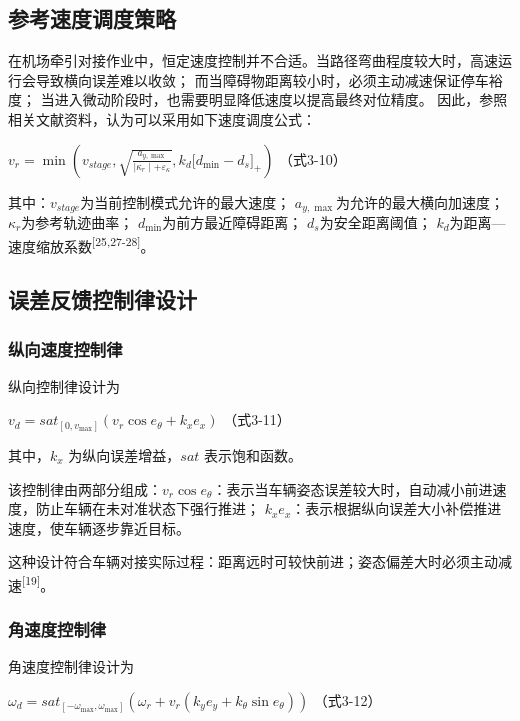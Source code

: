 \documentclass[UTF8,a4paper,12pt]{ctexart}
\begin{document}
\subsection{参考速度调度策略}\label{_Toc228997205}

在机场牵引对接作业中，恒定速度控制并不合适。当路径弯曲程度较大时，高速运行会导致横向误差难以收敛； 而当障碍物距离较小时，必须主动减速保证停车裕度； 当进入微动阶段时，也需要明显降低速度以提高最终对位精度。 因此，参照相关文献资料，认为可以采用如下速度调度公式：

\(v_{r} = \min\left( v_{stage},\sqrt{\frac{a_{y,\max}}{\mid \kappa_{r} \mid + \varepsilon_{\kappa}}},k_{d}\lbrack d_{\min} - d_{s}\rbrack_{+} \right)\) （式3-10）

其中：\(v_{stage}\)为当前控制模式允许的最大速度； \(a_{y,\max}\)为允许的最大横向加速度； \(\kappa_{r}\)为参考轨迹曲率； \(d_{\min}\)为前方最近障碍距离； \(d_{s}\)为安全距离阈值； \(k_{d}\)为距离---速度缩放系数\textsuperscript{[25,27-28]}。

\subsection{误差反馈控制律设计}\label{_Toc228997206}

\subsubsection{纵向速度控制律}\label{_Toc228997207}

纵向控制律设计为

\(v_{d} = {sat}_{\left\lbrack 0,v_{\max} \right\rbrack}\left( v_{r}\cos e_{\theta} + k_{x}e_{x} \right)\) （式3-11）

其中，\(k_{x}\) 为纵向误差增益，\(sat\) 表示饱和函数。

该控制律由两部分组成：\(v_{r}\cos e_{\theta}\)：表示当车辆姿态误差较大时，自动减小前进速度，防止车辆在未对准状态下强行推进； \(k_{x}e_{x}\)：表示根据纵向误差大小补偿推进速度，使车辆逐步靠近目标。

这种设计符合车辆对接实际过程：距离远时可较快前进；姿态偏差大时必须主动减速\textsuperscript{[19]}。

\subsubsection{角速度控制律}\label{_Toc228997208}

角速度控制律设计为

\(\omega_{d} = {sat}_{\left\lbrack - \omega_{\max},\omega_{\max} \right\rbrack}\left( \omega_{r} + v_{r}(k_{y}e_{y} + k_{\theta}\sin e_{\theta}) \right)\) （式3-12）
\end{document}
